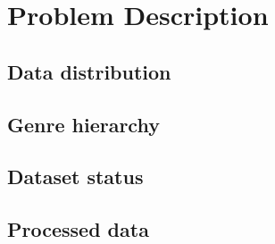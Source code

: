 
\chapter{Problem Description}

\label{problemdescription}


\section{Data distribution}


\section{Genre hierarchy}


\section{Dataset status}


\section{Processed data}


